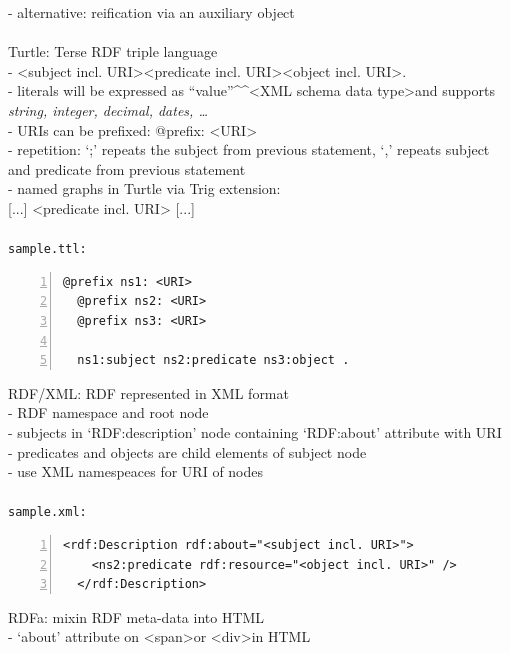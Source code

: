 - alternative: reification via an auxiliary object \\
\\
Turtle: Terse RDF triple language \\
- \textless subject incl. URI\textgreater \textless predicate incl. URI\textgreater \textless object incl. URI\textgreater . \\
- literals will be expressed as ``value''\^{}\^{}\textless XML schema data type\textgreater and supports \textit{string, integer, decimal, dates, \ldots} \\
- URIs can be prefixed: @prefix: \textless URI\textgreater \\
- repetition: `;' repeats the subject from previous statement, `,' repeats subject and predicate from previous statement \\
- named graphs in Turtle via Trig extension: \\
  { [...] } \textless predicate incl. URI\textgreater { [...] } \\
\\
\texttt{sample.ttl:}
\begin{lstlisting}[basicstyle=\ttfamily,numbers=left,numberstyle=\footnotesize\ttfamily,backgroundcolor=\color{sourcegray}]
  @prefix ns1: <URI>
  @prefix ns2: <URI>
  @prefix ns3: <URI>

  ns1:subject ns2:predicate ns3:object .
\end{lstlisting} \vspace{0.5cm}
RDF/XML: RDF represented in XML format \\
- RDF namespace and root node \\
- subjects in `RDF:description' node containing `RDF:about' attribute with URI \\
- predicates and objects are child elements of subject node \\
- use XML namespeaces for URI of nodes \\
\\
\texttt{sample.xml:}
\begin{lstlisting}[basicstyle=\ttfamily,numbers=left,numberstyle=\footnotesize\ttfamily,backgroundcolor=\color{sourcegray}]
  <rdf:Description rdf:about="<subject incl. URI>">
    <ns2:predicate rdf:resource="<object incl. URI>" />
  </rdf:Description>
\end{lstlisting} \vspace{0.5cm}
RDFa: mixin RDF meta-data into HTML \\
- `about' attribute on \textless span\textgreater or \textless div\textgreater in HTML \\
